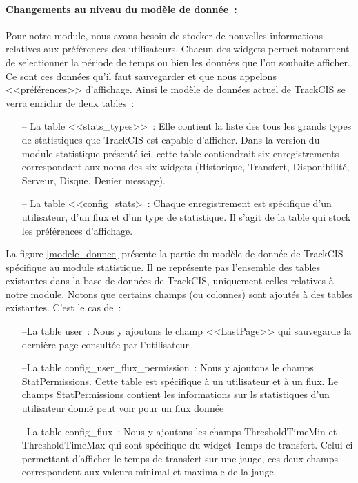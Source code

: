 			\paragraph{Changements au niveau du modèle de donnée~:}
			Pour notre module, nous avons besoin de stocker de nouvelles informations
			relatives aux préférences des utilisateurs. Chacun des widgets permet
			notamment de selectionner la période de temps ou bien les données que l'on
			souhaite afficher. Ce sont ces données qu'il faut sauvegarder et que nous
			appelons <<préférences>> d'affichage.
			Ainsi le modèle de données actuel de TrackCIS se verra enrichir de deux
			tables~:
			\begin{itemize}
			  \item[-- La table <<stats\_types>>~:] Elle contient la liste des tous les
			  grands types de statistiques que TrackCIS est capable d'afficher. Dans la
			  version du module statistique présenté ici, cette table contiendrait
			  six enregistrements correspondant aux noms des six widgets (Historique,
			  Transfert, Disponibilité, Serveur, Disque, Denier message).
			  \item[-- La table <<config\_stats>~:] Chaque enregistrement est spécifique
			  d'un utilisateur, d'un flux et d'un type de statistique. Il s'agit de la table
			  qui stock les préférences d'affichage.
			\end{itemize}
			La figure \ref{modele_donnee} présente la partie du modèle de donnée de
			TrackCIS spécifique au module statistique. Il ne représente pas
			l'ensemble des tables existantes dans la base de données de TrackCIS,
			uniquement celles relatives à notre module. Notons que certains champs (ou
			colonnes) sont ajoutés à des tables existantes. C'est le cas de~:
			\begin{itemize}
			  \item[--La table user~:] Nous y ajoutons le champ <<LastPage>> qui
			  sauvegarde la dernière page consultée par l'utilisateur
			  \item[--La table config\_user\_flux\_permission~:] Nous y ajoutons le
			  champs StatPermissions. Cette table est spécifique à un utilisateur et à un flux.
			  Le champs StatPermissions contient les informations sur ls statistiques
			  d'un utilisateur donné peut voir pour un flux donnée
			  \item[--La table config\_flux~:] Nous y ajoutons les champs
			  ThresholdTimeMin et ThresholdTimeMax qui sont spécifique du widget Temps de transfert.
			  Celui-ci permettant d'afficher le temps de transfert sur une jauge, ces
			  deux champs correspondent aux valeurs minimal et maximale de la jauge.
			\end{itemize}
